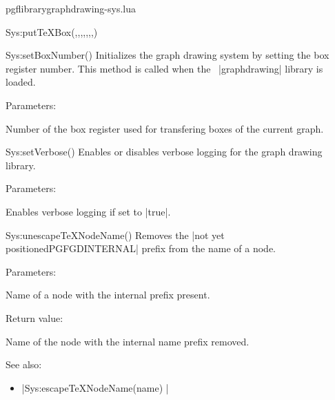 \begin{filedescription}{pgflibrarygraphdrawing-sys.lua}
\begin{luacommand}{{Sys:putTeXBox}(,,,,,,,)}
\end{luacommand}
\begin{luacommand}{{Sys:setBoxNumber}()}
Initializes the graph drawing system by setting the box register number.  This method is called when the \tikzname\ |graphdrawing| library is loaded. 

Parameters:
\begin{parameterdescription}
	\item[\meta{boxregister}] Number of the box register used for transfering boxes of the current graph. 
\end{parameterdescription}



\end{luacommand}
\begin{luacommand}{{Sys:setVerbose}()}
Enables or disables verbose logging for the graph drawing library. 

Parameters:
\begin{parameterdescription}
	\item[\meta{verbose}] Enables verbose logging if set to |true|. 
\end{parameterdescription}



\end{luacommand}
\begin{luacommand}{{Sys:unescapeTeXNodeName}()}
Removes the |not yet positionedPGFGDINTERNAL| prefix from the name of a node. 

Parameters:
\begin{parameterdescription}
	\item[\meta{name}] Name of a node with the internal prefix present. 
\end{parameterdescription}


Return value:
\begin{parameterdescription} 
  \item[] Name of the node with the internal name prefix removed. 
\end{parameterdescription}


See also:
\begin{itemize}
	\item[] |Sys:escapeTeXNodeName(name) |
\end{itemize}

\end{luacommand}

\end{filedescription}
